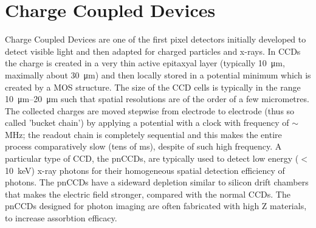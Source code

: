    
\section{Charge Coupled Devices}
   Charge Coupled Devices are one of the first pixel detectors initially developed to detect visible light and then adapted for charged particles and x-rays. 
   In CCDs the charge is created in a very thin active epitaxyal layer (typically \SI{10}{\um}, maximally about \SI{30}{\um}) and then locally stored in a potential minimum which is created by a MOS structure. 
   The size of the CCD cells is typically in the range \SIrange{10}{20}{\um} such that spatial resolutions are of the order of a few micrometres.
   The collected charges are moved stepwise from electrode to electrode (thus so called 'bucket chain') by applying a potential with a clock with frequency of $\sim$\si{MHz}; the readout chain is completely sequential and this makes the entire process comparatively slow (tens of \si{ms}), despite of such high frequency.
   A particular type of CCD, the pnCCDs, are typically used to detect low energy ($<$\SI{10}{keV}) x-ray photons for their homogeneous spatial detection efficiency of photons. The pnCCDs have a sideward depletion similar to silicon drift chambers that makes the electric field stronger, compared with the normal CCDs. 
   The pnCCDs designed for photon imaging are often fabricated with high Z materials, to increase assorbtion efficacy.

